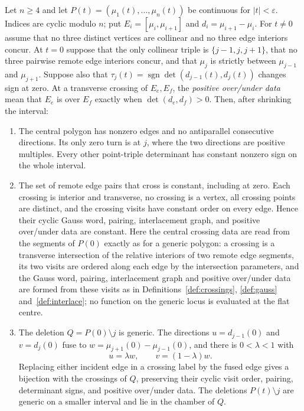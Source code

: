 \begin{lemma}\label{lem:flat-sides}\leanok
Let $n\geq4$ and let $P(t)=(\mu_1(t),\ldots,\mu_n(t))$ be continuous for
$|t|<\varepsilon$. Indices are cyclic modulo $n$; put
$E_i=[\mu_i,\mu_{i+1}]$ and $d_i=\mu_{i+1}-\mu_i$.
For $t\ne0$ assume that no three distinct vertices are collinear and no
three edge interiors concur. At $t=0$ suppose that the only collinear
triple is $\{j-1,j,j+1\}$, that no three pairwise remote edge interiors
concur, and that $\mu_j$ is strictly between $\mu_{j-1}$ and
$\mu_{j+1}$. Suppose also that
$\tau_j(t)=\operatorname{sgn}\det(d_{j-1}(t),d_j(t))$ changes sign at zero.
At a transverse crossing of $E_e,E_f$, the \emph{positive over/under
data} mean that $E_e$ is over $E_f$ exactly when $\det(d_e,d_f)>0$.
Then, after shrinking the interval:
\begin{enumerate}
\item[(i)] The central polygon has nonzero edges and no antiparallel
consecutive directions. Its only zero turn is at $j$, where the two
directions are positive multiples. Every other point-triple determinant
has constant nonzero sign on the whole interval.
\item[(ii)] The set of remote edge pairs that cross is constant,
including at zero. Each crossing is interior and transverse, no crossing
is a vertex, all crossing points are distinct, and the crossing visits
have constant order on every edge. Hence their cyclic Gauss word,
pairing, interlacement graph, and positive over/under data are constant.
Here the central crossing data are read from the segments of $P(0)$
exactly as for a generic polygon: a crossing is a transverse intersection
of the relative interiors of two remote edge segments, its two visits are
ordered along each edge by the intersection parameters, and the Gauss
word, pairing, interlacement graph and positive over/under data are formed
from these visits as in Definitions~\ref{def:crossings}, \ref{def:gauss}
and~\ref{def:interlace}; no function on the generic locus is evaluated at
the flat centre.
\item[(iii)] The deletion $Q=P(0)\setminus j$ is generic. The directions
$u=d_{j-1}(0)$ and $v=d_j(0)$ fuse to $w=\mu_{j+1}(0)-\mu_{j-1}(0)$,
and there is $0<\lambda<1$ with
\begin{equation}\label{flatpr:fusion}
u=\lambda w,\qquad v=(1-\lambda)w.
\end{equation}
Replacing either incident edge in a crossing label by the fused edge
gives a bijection with the crossings of $Q$, preserving their cyclic
visit order, pairing, determinant signs, and positive over/under data.
The deletions $P(t)\setminus j$ are generic on a smaller interval and
lie in the chamber of $Q$.
\end{enumerate}

\end{lemma}

